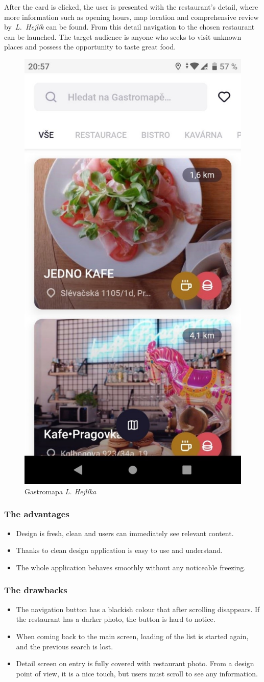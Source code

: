 After the card is clicked, the user is presented with the restaurant's detail, where more information such as opening hours, map location and comprehensive review by~\textit{L.~Hejlík} can be found. From this detail navigation to the chosen restaurant can be launched. The target audience is anyone who seeks to visit unknown places and possess the opportunity to taste great food.

\begin{figure}[ht]
    \centering
    \includegraphics[width=0.33\linewidth]{img/analysis/gastromapa_hejlik.jpg}
    \caption{Gastromapa \textit{L. Hejlíka}}
    \label{fig:gastromapa-hejlik}
\end{figure}

\subsubsection{The advantages}
\begin{itemize}
    \item Design is fresh, clean and users can immediately see relevant content.
    \item Thanks to clean design application is easy to use and understand.
    \item The whole application behaves smoothly without any noticeable freezing.
\end{itemize}

\subsubsection{The drawbacks}
\begin{itemize}
    \item The navigation button has a blackish colour that after scrolling disappears. If the restaurant has a darker photo, the button is hard to notice. 
    \item When coming back to the main screen, loading of the list is started again, and the previous search is lost.
    \item Detail screen on entry is fully covered with restaurant photo. From a design point of view, it is a nice touch, but users must scroll to see any information. 
\end{itemize}

